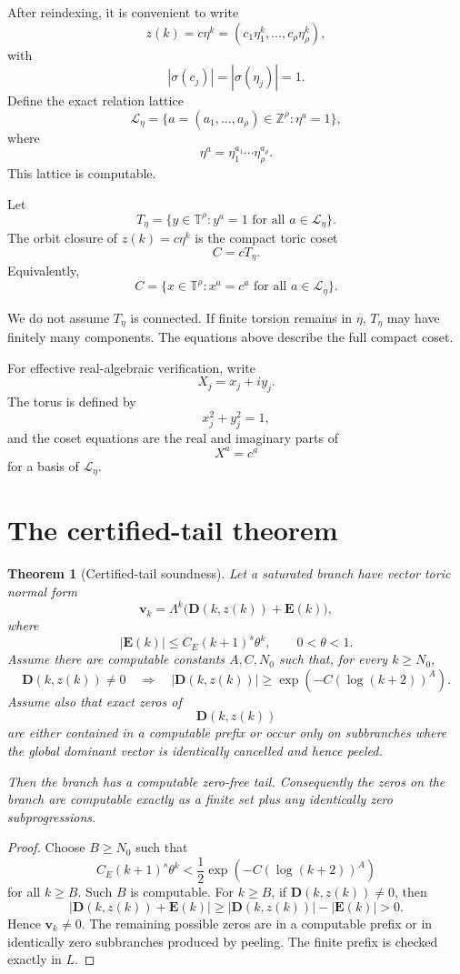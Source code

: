 \documentclass[11pt]{article}
\newtheorem{theorem}{Theorem}[section]
\newcommand{\T}{\mathbb T}
\newcommand{\Z}{\mathbb Z}
\begin{document}
After reindexing, it is convenient to write
\[
z(k)=c\eta^k=(c_1\eta_1^k,\ldots,c_\rho\eta_\rho^k),
\]
with
\[
|\sigma(c_j)|=|\sigma(\eta_j)|=1.
\]
Define the exact relation lattice
\[
\mathcal L_\eta
=
\{a=(a_1,\ldots,a_\rho)\in\Z^\rho:\eta^a=1\},
\]
where
\[
\eta^a=\eta_1^{a_1}\cdots\eta_\rho^{a_\rho}.
\]
This lattice is computable.

Let
\[
T_\eta=\{y\in\T^\rho:y^a=1\text{ for all }a\in\mathcal L_\eta\}.
\]
The orbit closure of \(z(k)=c\eta^k\) is the compact toric coset
\[
C=cT_\eta.
\]
Equivalently,
\[
C=\{x\in\T^\rho:x^a=c^a\text{ for all }a\in\mathcal L_\eta\}.
\]

We do not assume \(T_\eta\) is connected. If finite torsion remains in \(\eta\), \(T_\eta\) may have finitely many components. The equations above describe the full compact coset.

For effective real-algebraic verification, write
\[
X_j=x_j+iy_j.
\]
The torus is defined by
\[
x_j^2+y_j^2=1,
\]
and the coset equations are the real and imaginary parts of
\[
X^a=c^a
\]
for a basis of \(\mathcal L_\eta\).

\section{The certified-tail theorem}

\begin{theorem}[Certified-tail soundness]
Let a saturated branch have vector toric normal form
\[
\mathbf v_k=\Lambda^k\bigl(\mathbf D(k,z(k))+\mathbf E(k)\bigr),
\]
where
\[
|\mathbf E(k)|\le C_E(k+1)^s\theta^k,
\qquad
0<\theta<1.
\]
Assume there are computable constants \(A,C,N_0\) such that, for every \(k\ge N_0\),
\[
\mathbf D(k,z(k))\ne0
\quad\Longrightarrow\quad
|\mathbf D(k,z(k))|
\ge
\exp(-C(\log(k+2))^A).
\]
Assume also that exact zeros of
\[
\mathbf D(k,z(k))
\]
are either contained in a computable prefix or occur only on subbranches where the global dominant vector is identically cancelled and hence peeled.

Then the branch has a computable zero-free tail. Consequently the zeros on the branch are computable exactly as a finite set plus any identically zero subprogressions.
\end{theorem}

\begin{proof}
Choose \(B\ge N_0\) such that
\[
C_E(k+1)^s\theta^k
<
\frac12\exp(-C(\log(k+2))^A)
\]
for all \(k\ge B\). Such \(B\) is computable. For \(k\ge B\), if \(\mathbf D(k,z(k))\ne0\), then
\[
|\mathbf D(k,z(k))+\mathbf E(k)|
\ge
|\mathbf D(k,z(k))|-|\mathbf E(k)|
>0.
\]
Hence \(\mathbf v_k\ne0\). The remaining possible zeros are in a computable prefix or in identically zero subbranches produced by peeling. The finite prefix is checked exactly in \(L\).
\end{proof}
\end{document}
